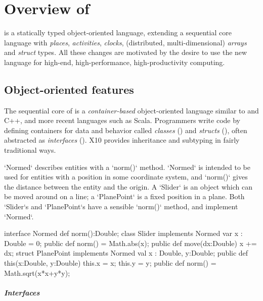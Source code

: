 \chapter{Overview of \Xten}

\Xten{} is a statically typed object-oriented language, extending a sequential
core language with \emph{places}, \emph{activities}, \emph{clocks},
(distributed, multi-dimensional) \emph{arrays} and \emph{struct} types. All
these changes are motivated by the desire to use the new language for
high-end, high-performance, high-productivity computing.

\section{Object-oriented features}

The sequential core of \Xten{} is a {\em container-based} object-oriented language
similar to \java{} and C++, and more recent languages such as Scala.  
Programmers write \Xten{} code by defining containers for data and behavior
called 
\emph{classes}
() and
\emph{structs}
(), 
often abstracted as 
\emph{interfaces}
().
X10 provides inheritance and subtyping in fairly traditional ways. 

\begin{ex}

\xcd`Normed` describes entities with a \xcd`norm()` method. \xcd`Normed` is
intended to be used for entities with a position in some coordinate system,
and \xcd`norm()` gives the distance between the entity and the origin. A
\xcd`Slider` is an object which can be moved around on a line; a
\xcd`PlanePoint` is a fixed position in a plane. Both \xcd`Slider`s and
\xcd`PlanePoint`s have a sensible \xcd`norm()` method, and implement
\xcd`Normed`.

\begin{xten}
interface Normed {
  def norm():Double;
}
class Slider implements Normed {
  var x : Double = 0;
  public def norm() = Math.abs(x);
  public def move(dx:Double) { x += dx; }
}
struct PlanePoint implements Normed {
  val x : Double, y:Double;
  public def this(x:Double, y:Double) {
    this.x = x; this.y = y;
  }
  public def norm() = Math.sqrt(x*x+y*y);
}
\end{xten}
%
\end{ex}

\paragraph{Interfaces}

